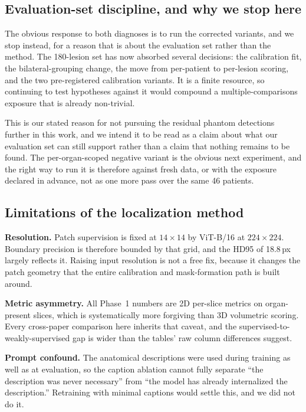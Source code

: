 \subsection{Evaluation-set discipline, and why we stop here}

The obvious response to both diagnoses is to run the corrected variants, and we
stop instead, for a reason that is about the evaluation set rather than the
method. The 180-lesion set has now absorbed several decisions: the calibration
fit, the bilateral-grouping change, the move from per-patient to per-lesion
scoring, and the two pre-registered calibration variants. It is a finite
resource, so continuing to test hypotheses against it would compound a
multiple-comparisons exposure that is already non-trivial.

This is our stated reason for not pursuing the residual phantom detections
further in this work, and we intend it to be read as a claim about what our
evaluation set can still support rather than a claim that nothing remains to be
found. The per-organ-scoped negative variant is the obvious next experiment, and
the right way to run it is therefore against fresh data, or with the exposure
declared in advance, not as one more pass over the same 46 patients.

\subsection{Limitations of the localization method}

\textbf{Resolution.} Patch supervision is fixed at $14\times14$ by ViT-B/16 at
$224\times224$. Boundary precision is therefore bounded by that grid, and the
HD95 of 18.8\,px largely reflects it. Raising input resolution is not a free
fix, because it changes the patch geometry that the entire calibration and
mask-formation path is built around.

\textbf{Metric asymmetry.} All Phase~1 numbers are 2D per-slice metrics on
organ-present slices, which is systematically more forgiving than 3D volumetric
scoring. Every cross-paper comparison here inherits that caveat, and the
supervised-to-weakly-supervised gap is wider than the tables' raw column
differences suggest.

\textbf{Prompt confound.} The anatomical descriptions were used during training
as well as at evaluation, so the caption ablation cannot fully separate ``the
description was never necessary'' from ``the model has already internalized the
description.'' Retraining with minimal captions would settle this, and we did
not do it.

